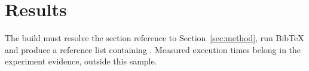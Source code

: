 \section{Results}
The build must resolve the section reference to Section~\ref{sec:method},
run BibTeX and produce a reference list containing \cite{lamport1994,knuth1984}.
Measured execution times belong in the experiment evidence, outside this sample.
